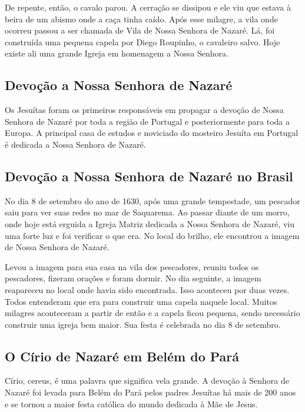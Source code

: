 \documentclass[a4paper,14pt]{extarticle} \usepackage[utf8]{inputenc}
\begin{document}
De repente, então, o cavalo parou. A cerração se dissipou e ele viu que estava à beira de um abismo onde a caça tinha caído. Após esse milagre, a vila onde ocorreu passou a ser chamada de Vila de Nossa Senhora de Nazaré. Lá, foi construída uma pequena capela por Diego Roupinho, o cavaleiro salvo. Hoje existe ali uma grande Igreja em homenagem a Nossa Senhora.

\subsection{Devoção a Nossa Senhora de Nazaré }

Os Jesuítas foram os primeiros responsáveis em propagar a devoção de Nossa Senhora de Nazaré por toda a região de Portugal e posteriormente para toda a Europa. A principal casa de estudos e noviciado do mosteiro Jesuíta em Portugal é dedicada a Nossa Senhora de Nazaré.

\subsection{Devoção a Nossa Senhora de Nazaré no Brasil}

No dia 8 de setembro do ano de 1630, após uma grande tempestade, um pescador saiu para ver suas redes no mar de Saquarema. Ao passar diante de um morro, onde hoje está erguida a Igreja Matriz dedicada a Nossa Senhora de Nazaré, viu uma forte luz e foi verificar o que era. No local do brilho, ele encontrou a imagem de Nossa Senhora de Nazaré.

Levou a imagem para sua casa na vila dos pescadores, reuniu todos os pescadores, fizeram orações e foram dormir. No dia seguinte, a imagem reapareceu no local onde havia sido encontrada. Isso aconteceu por duas vezes.  Todos entenderam que era para construir uma capela naquele local. Muitos milagres aconteceram a partir de então e a capela ficou pequena, sendo necessário construir uma igreja bem maior. Sua festa é celebrada no dia 8 de setembro.

\subsection{O Círio de Nazaré em Belém do Pará}

Círio, cereus, é uma palavra que significa vela grande.  A devoção à Senhora de Nazaré foi levada para Belém do Pará pelos padres Jesuítas há mais de 200 anos e se tornou a maior festa católica do mundo dedicada à Mãe de Jesus.
\end{document}
